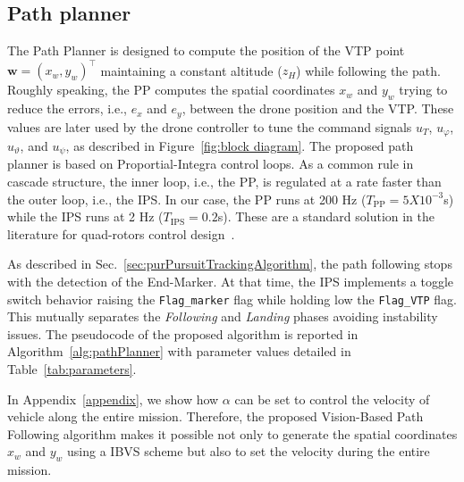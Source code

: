 \documentclass[a4paper,twocolumn,10pt]{article}
\begin{document}
    \subsection{Path planner}
    \label{sec:pathPlanner}

    The Path Planner is designed to compute the position of the VTP point $\mathbf{w} = (x_w, y_w)^\top$ maintaining a constant altitude ($z_H$) while following the path. Roughly speaking, the PP computes the spatial coordinates $x_w$ and $y_w$ trying to reduce the errors, i.e., $e_x$ and $e_y$, between the drone position and the VTP. These values are later used by the drone controller to tune the command signals $u_T$, $u_\varphi$, $u_\vartheta$, and $u_\psi$, as 
    described in Figure~\ref{fig:block diagram}. The proposed path planner is based on Proportial-Integra control loops. As a common rule in cascade structure, the inner loop, i.e., the PP, is regulated at a 
    rate faster than the outer loop, i.e., the IPS. In our case, the PP runs at 200 Hz ($T_\mathrm{PP} = 5X10^{-3}$s) while the IPS runs at 2 Hz ($T_\mathrm{IPS} = 0.2$s). These are a standard solution in the 
    literature for quad-rotors control design~\cite{Dief2015}.

    As described in Sec.~\ref{sec:purPursuitTrackingAlgorithm}, the path following stops with the detection of the End-Marker. At that time, the IPS implements a toggle switch behavior raising the \texttt{Flag\_marker} flag while holding low the \texttt{Flag\_VTP} flag. This mutually separates the \textit{Following} and \textit{Landing} phases avoiding instability issues. The 
    pseudocode of the proposed algorithm is reported in Algorithm~\ref{alg:pathPlanner} with parameter 
    values detailed in Table~\ref{tab:parameters}.

    In Appendix~\ref{appendix}, we show how $\alpha$ can be set to control the velocity of vehicle along the entire mission. Therefore, the proposed Vision-Based Path Following algorithm makes it possible not only to generate the spatial coordinates $x_w$ and $y_w$ using a IBVS scheme but also to set the velocity during the entire mission.
\end{document}
